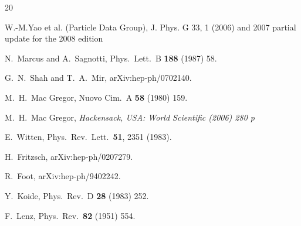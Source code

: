 \documentclass[a4paper,10pt]{article}
\begin{document}
\begin{thebibliography}{20}

 W.-M.Yao et al. (Particle Data Group), J. Phys. G 33, 1 (2006) and 2007 partial update for the 2008 edition

  N.~Marcus and A.~Sagnotti,
  Phys.\ Lett.\  B {\bf 188} (1987) 58.

  G.~N.~Shah and T.~A.~Mir,
  arXiv:hep-ph/0702140.

  M.~H.~Mac Gregor,
  Nuovo Cim.\  A {\bf 58} (1980) 159.

  M.~H.~Mac Gregor,
{\it  Hackensack, USA: World Scientific (2006) 280 p}

  E.~Witten,
  Phys.\ Rev.\ Lett.\  {\bf 51}, 2351 (1983).

  H.~Fritzsch,
  arXiv:hep-ph/0207279.

  R.~Foot,
  arXiv:hep-ph/9402242.

  Y.~Koide,
  Phys.\ Rev.\  D {\bf 28} (1983) 252.


  F.~Lenz,
  Phys.\ Rev.\   {\bf 82} (1951) 554.



\end{thebibliography}
\end{document}
